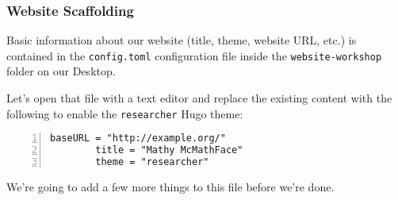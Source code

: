 \begin{frame}[fragile]
    \frametitle{Website Scaffolding}

    Basic information about our website (title, theme, website URL, etc.) is contained in the \texttt{config.toml} 
    configuration file inside the \texttt{website-workshop} folder on our Desktop. 
    
    \medskip

    Let's open that file with a
    text editor and replace the existing content with the following to enable the \texttt{researcher} Hugo theme:

    \bigskip

    \begin{lstlisting}[style=saneCode,gobble=8,title={config.toml},numbers=left]
        baseURL = "http://example.org/"
        title = "Mathy McMathFace"
        theme = "researcher"
    \end{lstlisting}

    \vfill

    We're going to add a few more things to this file before we're done.
\end{frame}
